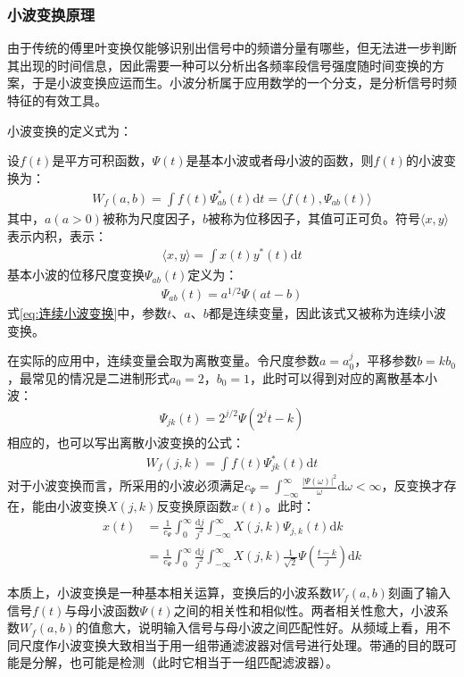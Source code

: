 \documentclass{ctexart}
\begin{document}
			\subsubsection{小波变换原理}
				由于传统的傅里叶变换仅能够识别出信号中的频谱分量有哪些，但无法进一步判断其出现的时间信息，因此需要一种可以分析出各频率段信号强度随时间变换的方案，于是小波变换应运而生。小波分析属于应用数学的一个分支，是分析信号时频特征的有效工具。\par
				小波变换的定义式为：\par
				设$f(t)$是平方可积函数，$\Psi(t)$是基本小波或者母小波的函数，则$f(t)$的小波变换为：
				\begin{gather}
					W_f(a,b)=\int f(t)\Psi_{ab}^*(t)\mathrm{d}t=\langle f(t),\Psi_{ab}(t)\rangle 
					\label{eq:连续小波变换}
				\end{gather}
				其中，$a(a>0)$被称为尺度因子，$b$被称为位移因子，其值可正可负。符号$\langle	x,y\rangle$表示内积，表示：
				\begin{gather}
					\langle	x,y\rangle=\int x(t)y^*(t)\mathrm{d}t
				\end{gather}
				基本小波的位移尺度变换$\Psi_{ab}(t)$定义为：
				\begin{gather}
					\Psi_{ab}(t)=a^{1/2}\Psi(at-b)
					\label{eq:基本连续小波变换公式}
				\end{gather}
				式\ref{eq:连续小波变换}中，参数$t$、$a$、$b$都是连续变量，因此该式又被称为连续小波变换。\par
				在实际的应用中，连续变量会取为离散变量。令尺度参数$a=a_0^j$，平移参数$b=kb_0$，最常见的情况是二进制形式$a_0=2$，$b_0=1$，此时可以得到对应的离散基本小波：
				\begin{gather}
					\Psi_{jk}(t)=2^{j/2}\Psi(2^jt-k)
				\end{gather}
				相应的，也可以写出离散小波变换的公式：
				\begin{gather}
					W_f(j,k)=\int f(t)\Psi_{jk}^*(t)\mathrm{d}t
				\end{gather}
				对于小波变换而言，所采用的小波必须满足$c_\Psi=\int_{-\infty}^{\infty}\frac{\lvert \Psi(\omega)\rvert^2}{\omega}\mathrm{d}\omega<\infty$，反变换才存在，能由小波变换$X(j,k)$反变换原函数$x(t)$。此时：
				\begin{align}
					x(t)&=\frac{1}{c_\Psi}\int_{0}^{\infty}\frac{\mathrm{d}j}{j^2}\int_{-\infty}^{\infty}X(j,k)\Psi_{j,k}(t)\mathrm{d}k
					\label{eq:频率切片函数逆变换}
					\\
					&=\frac{1}{c_\Psi}\int_{0}^{\infty}\frac{\mathrm{d}j}{j^2}\int_{-\infty}^{\infty}X(j,k)\frac{1}{\sqrt{2}}\Psi(\frac{t-k}{j})\mathrm{d}k
				\end{align}\par
				本质上，小波变换是一种基本相关运算，变换后的小波系数$W_f(a,b)$刻画了输入信号$f(t)$与母小波函数$\Psi(t)$之间的相关性和相似性。两者相关性愈大，小波系数$W_f(a,b)$的值愈大，说明输入信号与母小波之间匹配性好。从频域上看，用不同尺度作小波变换大致相当于用一组带通滤波器对信号进行处理。带通的目的既可能是分解，也可能是检测（此时它相当于一组匹配滤波器）。
\end{document}
